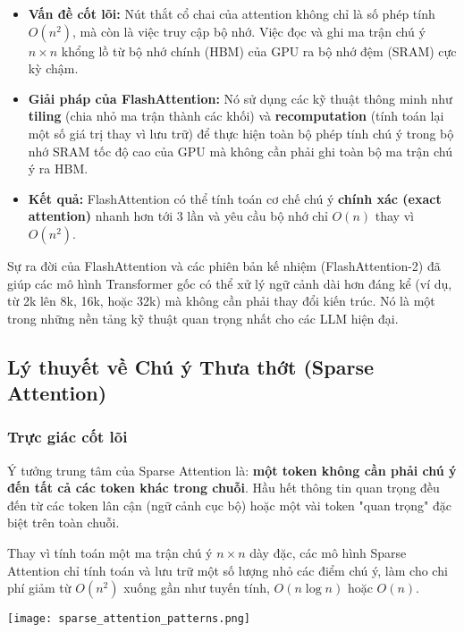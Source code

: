 \begin{itemize}
    \item \textbf{Vấn đề cốt lõi:} Nút thắt cổ chai của attention không chỉ là số phép tính $O(n^2)$, mà còn là việc truy cập bộ nhớ. Việc đọc và ghi ma trận chú ý $n \times n$ khổng lồ từ bộ nhớ chính (HBM) của GPU ra bộ nhớ đệm (SRAM) cực kỳ chậm.
    \item \textbf{Giải pháp của FlashAttention:} Nó sử dụng các kỹ thuật thông minh như \textbf{tiling} (chia nhỏ ma trận thành các khối) và \textbf{recomputation} (tính toán lại một số giá trị thay vì lưu trữ) để thực hiện toàn bộ phép tính chú ý trong bộ nhớ SRAM tốc độ cao của GPU mà không cần phải ghi toàn bộ ma trận chú ý ra HBM.
    \item \textbf{Kết quả:} FlashAttention có thể tính toán cơ chế chú ý \textbf{chính xác (exact attention)} nhanh hơn tới 3 lần và yêu cầu bộ nhớ chỉ $O(n)$ thay vì $O(n^2)$.
\end{itemize}
Sự ra đời của FlashAttention và các phiên bản kế nhiệm (FlashAttention-2) đã giúp các mô hình Transformer gốc có thể xử lý ngữ cảnh dài hơn đáng kể (ví dụ, từ 2k lên 8k, 16k, hoặc 32k) mà không cần phải thay đổi kiến trúc. Nó là một trong những nền tảng kỹ thuật quan trọng nhất cho các LLM hiện đại.
\subsection{Lý thuyết về Chú ý Thưa thớt (Sparse Attention)}
\label{ssec:sparse_attention_theory}

\subsubsection{Trực giác cốt lõi}
Ý tưởng trung tâm của Sparse Attention là: \textbf{một token không cần phải chú ý đến tất cả các token khác trong chuỗi}. Hầu hết thông tin quan trọng đều đến từ các token lân cận (ngữ cảnh cục bộ) hoặc một vài token "quan trọng" đặc biệt trên toàn chuỗi.

Thay vì tính toán một ma trận chú ý $n \times n$ dày đặc, các mô hình Sparse Attention chỉ tính toán và lưu trữ một số lượng nhỏ các điểm chú ý, làm cho chi phí giảm từ $O(n^2)$ xuống gần như tuyến tính, $O(n \log n)$ hoặc $O(n)$.

\begin{center}
    \texttt{[image: sparse\_attention\_patterns.png]}
    \label{fig:sparse_attention_patterns}
\end{center}

